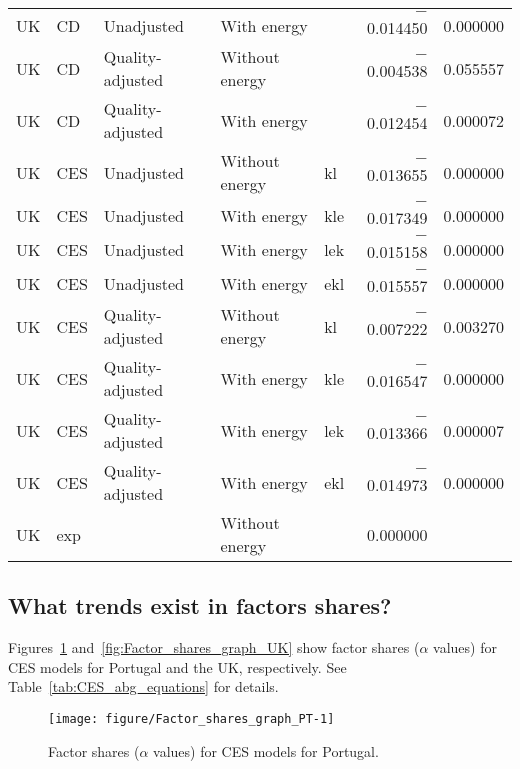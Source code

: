 \documentclass[preprint,authoryear,12pt]{elsarticle}\usepackage[]{graphicx}\usepackage[]{color}
\makeatletter
\def\maxwidth{ %
  \ifdim\Gin@nat@width>\linewidth
    \linewidth
  \else
    \Gin@nat@width
  \fi
}
\newenvironment{knitrout}{}{} %
\makeatother
\begin{document}
\begin{table}[ht]
{\begin{tabular}{lllllrr}
  UK & CD & Unadjusted & With energy &  & $-$0.014450 & 0.000000 \\ 
  UK & CD & Quality-adjusted & Without energy &  & $-$0.004538 & 0.055557 \\ 
  UK & CD & Quality-adjusted & With energy &  & $-$0.012454 & 0.000072 \\ 
  UK & CES & Unadjusted & Without energy & kl & $-$0.013655 & 0.000000 \\ 
  UK & CES & Unadjusted & With energy & kle & $-$0.017349 & 0.000000 \\ 
  UK & CES & Unadjusted & With energy & lek & $-$0.015158 & 0.000000 \\ 
  UK & CES & Unadjusted & With energy & ekl & $-$0.015557 & 0.000000 \\ 
  UK & CES & Quality-adjusted & Without energy & kl & $-$0.007222 & 0.003270 \\ 
  UK & CES & Quality-adjusted & With energy & kle & $-$0.016547 & 0.000000 \\ 
  UK & CES & Quality-adjusted & With energy & lek & $-$0.013366 & 0.000007 \\ 
  UK & CES & Quality-adjusted & With energy & ekl & $-$0.014973 & 0.000000 \\ 
  UK & exp &  & Without energy &  & 0.000000 &  \\ 
   \hline
\end{tabular}
}
\end{table}



\subsection{What trends exist in factors shares?} 
\label{sec:factor_shares}

Figures~\ref{fig:Factor_shares_graph_PT} and~\ref{fig:Factor_shares_graph_UK}
show factor shares ($\alpha$ values) for CES models for
Portugal and the UK, respectively.
See Table~\ref{tab:CES_abg_equations} for details.



\begin{knitrout}
\color{fgcolor}\begin{figure}[H]

{\centering \texttt{[image: figure/Factor\_shares\_graph\_PT-1]} 

}

\caption[Factor shares (]{Factor shares ($\alpha$ values) for CES models for Portugal.}\label{fig:Factor_shares_graph_PT}
\end{figure}


\end{knitrout}
\end{document}
